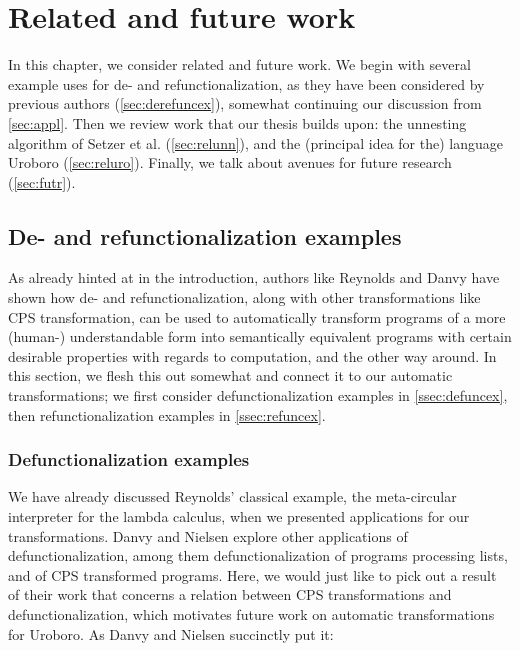 \chapter{Related and future work}

In this chapter, we consider related and future work. We begin with several example uses for de- and refunctionalization, as they have been considered by previous authors (\autoref{sec:derefuncex}), somewhat continuing our discussion from \autoref{sec:appl}. Then we review work that our thesis builds upon: the unnesting algorithm of Setzer et al. (\autoref{sec:relunn}), and the (principal idea for the) language Uroboro (\autoref{sec:reluro}). Finally, we talk about avenues for future research (\autoref{sec:futr}).

\section{De- and refunctionalization examples}
\label{sec:derefuncex}

As already hinted at in the introduction, authors like Reynolds and Danvy have shown how de- and refunctionalization, along with other transformations like CPS transformation, can be used to automatically transform programs of a more (human-) understandable form into semantically equivalent programs with certain desirable properties with regards to computation, and the other way around. In this section, we flesh this out somewhat and connect it to our automatic transformations; we first consider defunctionalization examples in \autoref{ssec:defuncex}, then refunctionalization examples in \autoref{ssec:refuncex}.

\subsection{Defunctionalization examples}
\label{ssec:defuncex}

We have already discussed Reynolds' classical example, the meta-circular interpreter for the lambda calculus, when we presented applications for our transformations. Danvy and Nielsen\cite{danvy01defunctionalization} explore other applications of defunctionalization, among them defunctionalization of programs processing lists, and of CPS transformed programs. Here, we would just like to pick out a result of their work that concerns a relation between CPS transformations and defunctionalization, which motivates future work on automatic transformations for Uroboro. As Danvy and Nielsen succinctly put it:


